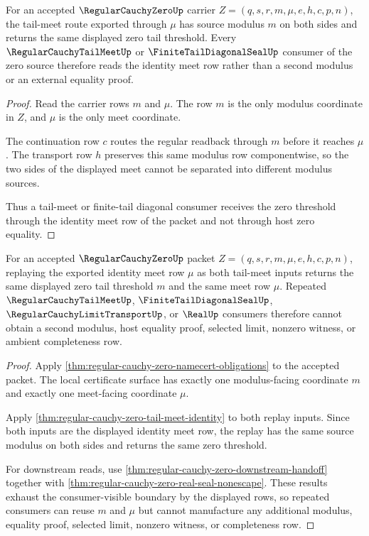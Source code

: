 \begin{theorem}
\label{thm:regular-cauchy-zero-tail-meet-identity}
For an accepted $\RegularCauchyZeroUp$ carrier $Z=(q,s,r,m,\mu,e,h,c,p,n)$, the tail-meet route exported through $\mu$ has source modulus $m$ on both sides and returns the same displayed zero tail threshold. Every $\RegularCauchyTailMeetUp$ or $\FiniteTailDiagonalSealUp$ consumer of the zero source therefore reads the identity meet row rather than a second modulus or an external equality proof.
\end{theorem}
\begin{proof}
Read the carrier rows $m$ and $\mu$. The row $m$ is the only modulus coordinate in $Z$, and $\mu$ is the only meet coordinate.

The continuation row $c$ routes the regular readback through $m$ before it reaches $\mu$. The transport row $h$ preserves this same modulus row componentwise, so the two sides of the displayed meet cannot be separated into different modulus sources.

Thus a tail-meet or finite-tail diagonal consumer receives the zero threshold through the identity meet row of the packet and not through host zero equality.
\end{proof}

\begin{theorem}
\label{thm:regular-cauchy-zero-tail-meet-idempotent-replay}
For an accepted $\RegularCauchyZeroUp$ packet $Z=(q,s,r,m,\mu,e,h,c,p,n)$, replaying the exported identity meet row $\mu$ as both tail-meet inputs returns the same displayed zero tail threshold $m$ and the same meet row $\mu$. Repeated $\RegularCauchyTailMeetUp$, $\FiniteTailDiagonalSealUp$, $\RegularCauchyLimitTransportUp$, or $\RealUp$ consumers therefore cannot obtain a second modulus, host equality proof, selected limit, nonzero witness, or ambient completeness row.
\end{theorem}
\begin{proof}
Apply \autoref{thm:regular-cauchy-zero-namecert-obligations} to the accepted packet. The local certificate surface has exactly one modulus-facing coordinate $m$ and exactly one meet-facing coordinate $\mu$.

Apply \autoref{thm:regular-cauchy-zero-tail-meet-identity} to both replay inputs. Since both inputs are the displayed identity meet row, the replay has the same source modulus on both sides and returns the same zero threshold.

For downstream reads, use \autoref{thm:regular-cauchy-zero-downstream-handoff} together with \autoref{thm:regular-cauchy-zero-real-seal-nonescape}. These results exhaust the consumer-visible boundary by the displayed rows, so repeated consumers can reuse $m$ and $\mu$ but cannot manufacture any additional modulus, equality proof, selected limit, nonzero witness, or completeness row.
\end{proof}

